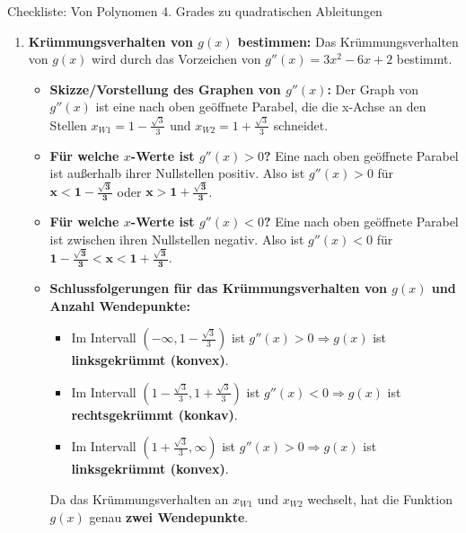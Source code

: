 \begin{loesungsumgebung}{Checkliste: Von Polynomen 4. Grades zu quadratischen Ableitungen}
\begin{enumerate}[label=(\alph*)]
    \item \textbf{Krümmungsverhalten von $g(x)$ bestimmen:}
    Das Krümmungsverhalten von $g(x)$ wird durch das Vorzeichen von $g''(x) = 3x^2 - 6x + 2$ bestimmt.
    \begin{itemize}
        \item \textbf{Skizze/Vorstellung des Graphen von $g''(x)$:}
        Der Graph von $g''(x)$ ist eine nach oben geöffnete Parabel, die die x-Achse an den Stellen $x_{W1} = 1 - \frac{\sqrt{3}}{3}$ und $x_{W2} = 1 + \frac{\sqrt{3}}{3}$ schneidet.
        \item \textbf{Für welche $x$-Werte ist $g''(x) > 0$?}
        Eine nach oben geöffnete Parabel ist außerhalb ihrer Nullstellen positiv.
        Also ist $g''(x) > 0$ für $\mathbf{x < 1 - \frac{\sqrt{3}}{3}}$ oder $\mathbf{x > 1 + \frac{\sqrt{3}}{3}}$.
        \item \textbf{Für welche $x$-Werte ist $g''(x) < 0$?}
        Eine nach oben geöffnete Parabel ist zwischen ihren Nullstellen negativ.
        Also ist $g''(x) < 0$ für $\mathbf{1 - \frac{\sqrt{3}}{3} < x < 1 + \frac{\sqrt{3}}{3}}$.
        \item \textbf{Schlussfolgerungen für das Krümmungsverhalten von $g(x)$ und Anzahl Wendepunkte:}
        \begin{itemize}
            \item Im Intervall $(-\infty, 1 - \frac{\sqrt{3}}{3})$ ist $g''(x) > 0 \Rightarrow g(x)$ ist \textbf{linksgekrümmt (konvex)}.
            \item Im Intervall $(1 - \frac{\sqrt{3}}{3}, 1 + \frac{\sqrt{3}}{3})$ ist $g''(x) < 0 \Rightarrow g(x)$ ist \textbf{rechtsgekrümmt (konkav)}.
            \item Im Intervall $(1 + \frac{\sqrt{3}}{3}, \infty)$ ist $g''(x) > 0 \Rightarrow g(x)$ ist \textbf{linksgekrümmt (konvex)}.
        \end{itemize}
        Da das Krümmungsverhalten an $x_{W1}$ und $x_{W2}$ wechselt, hat die Funktion $g(x)$ genau \textbf{zwei Wendepunkte}.
    \end{itemize}


\end{enumerate}
\end{loesungsumgebung}
